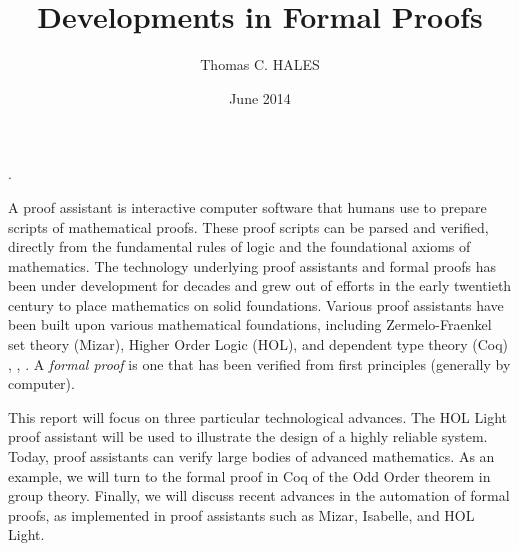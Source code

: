 \documentclass[brochure,english,12pt]{bourbaki}
\date{June 2014}
\title{Developments in Formal Proofs}
\author{Thomas C. HALES}
\theoremstyle{plain}
\begin{document}
\maketitle



{

. %




}

\bigskip



A proof assistant is interactive computer software that humans use to prepare scripts of mathematical proofs.
These proof scripts can be parsed and verified, directly from
the fundamental rules of logic and the foundational axioms of mathematics.  
The
technology underlying proof assistants and formal proofs has been under development for decades and grew out
of efforts in the early twentieth century to place mathematics on solid foundations.
Various proof assistants have been built upon various mathematical foundations, including
Zermelo-Fraenkel set theory (Mizar), Higher Order Logic (HOL), and dependent type theory (Coq)
\cite{Mizar}, \cite{HOLL}, \cite{Coq}.
A {\it formal proof} is one that has been verified from first principles (generally by computer).  


This report
will focus on three  particular technological advances.
The HOL Light proof assistant will be used to illustrate the design of a highly reliable system.
Today, proof assistants can verify large bodies of advanced 
mathematics.    As an example, we will
turn to the formal proof in Coq of the Odd Order theorem in group theory.
Finally, we will discuss recent advances in the automation of formal proofs, as implemented in proof assistants
such as Mizar, Isabelle, and HOL Light.

\end{document}
